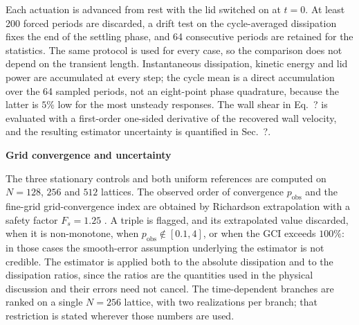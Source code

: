 \documentclass[11pt,a4paper]{article}
\newenvironment{chgdel}{\par\color{red}}{\par\color{black}}
\begin{document}
\begin{chgdel}
Each actuation is advanced from rest with the lid switched on at $t=0$. At least
200 forced periods are discarded, a drift test on the cycle-averaged dissipation
fixes the end of the settling phase, and 64 consecutive periods are retained for
the statistics. The same protocol is used for every case, so the comparison does
not depend on the transient length. Instantaneous dissipation, kinetic energy and
lid power are accumulated at every step; the cycle mean is a direct accumulation
over the 64 sampled periods, not an eight-point phase quadrature, because the
latter is $5\%$ low for the most unsteady responses. The wall shear in
Eq.~? is evaluated with a first-order one-sided derivative of the
recovered wall velocity, and the resulting estimator uncertainty is quantified in
Sec.~?.

\textbf{Grid convergence and uncertainty}

The three stationary controls and both uniform references are computed on
$N=128$, $256$ and $512$ lattices. The observed order of convergence
$p_{\mathrm{obs}}$ and the fine-grid grid-convergence index are obtained by
Richardson extrapolation with a safety factor $F_s=1.25$
. A triple is flagged, and its
extrapolated value discarded, when it is non-monotone, when
$p_{\mathrm{obs}}\notin[0.1,4]$, or when the GCI exceeds $100\%$: in those cases
the smooth-error assumption underlying the estimator is not credible. The
estimator is applied both to the absolute dissipation and to the dissipation
ratios, since the ratios are the quantities used in the physical discussion and
their errors need not cancel. The time-dependent branches are ranked on a single
$N=256$ lattice, with two realizations per branch; that restriction is stated
wherever those numbers are used.
\end{chgdel}
\end{document}
